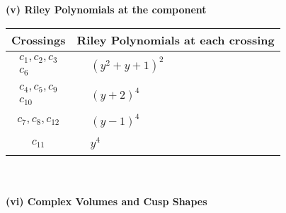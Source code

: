 \documentclass[1p]{elsarticle_modified}
\theoremstyle{definition}
\begin{document}
\newpage\renewcommand{\arraystretch}{1}
\flushleft \textbf{(v) Riley Polynomials at the component}\newline \\
\begin{tabular}{m{50pt}|m{274pt}}
Crossings & \hspace{64pt}Riley Polynomials at each crossing \\
\hline $$\begin{aligned}c_{1},c_{2},c_{3}\\c_{6}\end{aligned}$$&$\begin{aligned}
&(y^2+y+1)^2
\end{aligned}$\\
\hline $$\begin{aligned}c_{4},c_{5},c_{9}\\c_{10}\end{aligned}$$&$\begin{aligned}
&(y+2)^4
\end{aligned}$\\
\hline $$\begin{aligned}c_{7},c_{8},c_{12}\end{aligned}$$&$\begin{aligned}
&(y-1)^4
\end{aligned}$\\
\hline $$\begin{aligned}c_{11}\end{aligned}$$&$\begin{aligned}
&y^4
\end{aligned}$\\
\hline
\end{tabular}\\~\\
\newpage\flushleft \textbf{(vi) Complex Volumes and Cusp Shapes}
\end{document}
